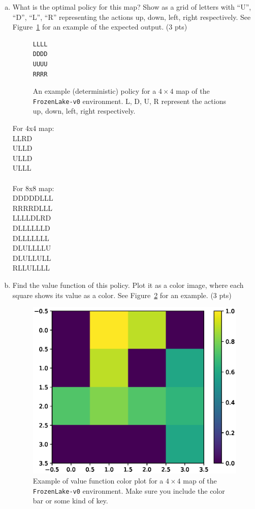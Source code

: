 \documentclass[12pt]{article}
\begin{document}
\begin{enumerate}[a)]
\item What is the optimal policy for this map? Show as a grid of letters with ``U'', ``D'', ``L'', ``R'' representing the actions up, down, left, right respectively. See Figure~\ref{fig:prob2_example_policy} for an example of the expected output. (3 pts)

\begin{figure}[ht]
  \centering
  \begin{BVerbatim}
LLLL
DDDD
UUUU
RRRR
  \end{BVerbatim}
  \caption{\label{fig:prob2_example_policy} An example (deterministic) policy for a $4 \times 4$ map of the \texttt{FrozenLake-v0} environment. L, D, U, R represent the actions up, down, left, right respectively.}
\end{figure}

\begin{solution}
For 4x4 map: \\
LLRD \\
ULLD \\
ULLD \\
ULLL \\ \\%
For 8x8 map: \\
DDDDDLLL \\
RRRRDLLL \\
LLLLDLRD \\
DLLLLLLD \\
DLLLLLLL \\
DLULLLLU \\
DLULLULL \\
RLLULLLL
\end{solution}

\item Find the value function of this policy. Plot it as a color image, where each square shows its value as a color. See Figure~\ref{fig:prob3_value_image} for an example. (3 pts)

\begin{figure}[h]
  \centering
  \includegraphics[width=.5\textwidth]{figures/value_function_plot.eps}
  \caption{\label{fig:prob3_value_image} Example of value function
    color plot for a $4 \times 4$ map of the \texttt{FrozenLake-v0} environment. Make sure you include the color bar or some kind of key.}
\end{figure}


\end{enumerate}
\end{document}
